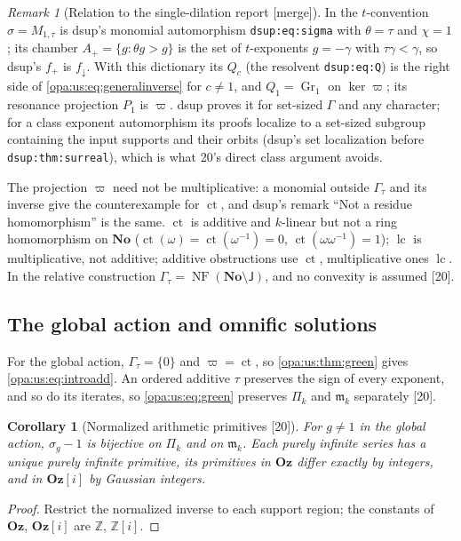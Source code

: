 \documentclass[11pt,oneside]{article}
\numberwithin{equation}{section}
\newtheorem{corollary}[corollary]{Corollary}
\theoremstyle{definition}
\theoremstyle{remark}
\newtheorem{remark}[remark]{Remark}
\newcommand{\No}{\mathbf{No}}
\newcommand{\Oz}{\mathbf{Oz}}
\newcommand{\Og}{\mathbf{Oz}[i]}
\newcommand{\Z}{\mathbb Z}
\newcommand{\mm}{\mathfrak m}
\newcommand{\lc}{\operatorname{lc}}
\newcommand{\ct}{\operatorname{ct}}
\newcommand{\src}[1]{\textup{\textsf{\small[#1]}}}
\newcommand{\mergetag}{\textup{\textsf{\small[merge]}}}
\newcommand{\lbl}[1]{\nolinkurl{#1}}
\newcommand{\NF}{\operatorname{NF}}
\begin{document}
\begin{remark}[Relation to the single-dilation report \mergetag]\label{opa:us:rem:dsup}
In the $t$-convention $\sigma=M_{1,\tau}$ is dsup's monomial automorphism \lbl{dsup:eq:sigma} with $\theta=\tau$ and $\chi=1$; its chamber
$A_+=\{g:\theta g>g\}$ is the set of $t$-exponents $g=-\gamma$ with $\tau\gamma<\gamma$, so dsup's $f_+$ is $f_\downarrow$. With this dictionary its $Q_c$
(the resolvent \lbl{dsup:eq:Q}) is the right side of \eqref{opa:us:eq:generalinverse} for $c\ne1$, and $Q_1=\operatorname{Gr}_1$ on $\ker\varpi$; its
resonance projection $P_1$ is $\varpi$. dsup proves it for set-sized $\Gamma$ and any character; for a class exponent automorphism its proofs
localize to a set-sized subgroup containing the input supports and their orbits (dsup's set localization before \lbl{dsup:thm:surreal}),
which is what 20's direct class argument avoids.
\end{remark}

The projection $\varpi$ need not be multiplicative: a monomial outside $\Gamma_\tau$ and its inverse give the counterexample for $\ct$, and dsup's
remark ``Not a residue homomorphism'' is the same. $\ct$ is additive and $k$-linear but not a ring homomorphism on $\No$ ($\ct(\omega)=\ct(\omega^{-1})=0$,
$\ct(\omega\omega^{-1})=1$); $\lc$ is multiplicative, not additive; additive obstructions use $\ct$, multiplicative ones $\lc$. In the relative
construction $\Gamma_\tau=\NF(\No\setminus\mathsf J)$, and no convexity is assumed \src{20}.

\subsection{The global action and omnific solutions}

For the global action, $\Gamma_\tau=\{0\}$ and $\varpi=\ct$, so \cref{opa:us:thm:green} gives \eqref{opa:us:eq:introadd}. An ordered additive $\tau$
preserves the sign of every exponent, and so do its iterates, so \eqref{opa:us:eq:green} preserves $\Pi_k$ and $\mm_k$ separately \src{20}.

\begin{corollary}[Normalized arithmetic primitives \src{20}]\label{opa:us:cor:primitives}
For $g\ne1$ in the global action, $\sigma_g-1$ is bijective on $\Pi_k$ and on $\mm_k$. Each purely infinite series has a unique purely infinite
primitive, its primitives in $\Oz$ differ exactly by integers, and in $\Og$ by Gaussian integers.
\end{corollary}
\begin{proof}
Restrict the normalized inverse to each support region; the constants of $\Oz$, $\Og$ are $\Z$, $\Z[i]$.
\end{proof}
\end{document}
